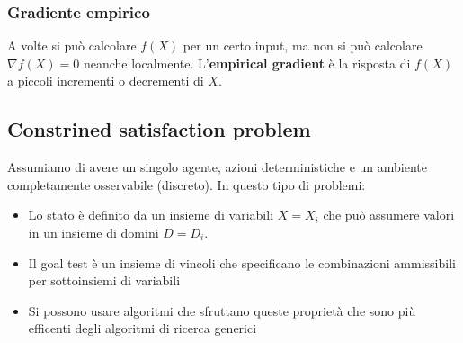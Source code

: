 \documentclass[a4paper]{article}
\begin{document}
\subsubsection{Gradiente empirico}
A volte si può calcolare \( f(X) \) per un certo input, ma non si può calcolare
\( \nabla f(X) = 0 \) neanche localmente. L'\textbf{empirical gradient} è la risposta
di \( f(X) \) a piccoli incrementi o decrementi di \( X \).

\subsection{Constrined satisfaction problem}
Assumiamo di avere un singolo agente, azioni deterministiche e un ambiente completamente
osservabile (discreto). In questo tipo di problemi:
\begin{itemize}
  \item Lo stato è definito da un insieme di variabili \( X = X_i \) che può assumere
    valori in un insieme di domini \( D = D_i \).
  \item Il goal test è un insieme di vincoli che specificano le combinazioni ammissibili
    per sottoinsiemi di variabili
  \item Si possono usare algoritmi che sfruttano queste proprietà che sono più efficenti
    degli algoritmi di ricerca generici
\end{itemize}
\end{document}

